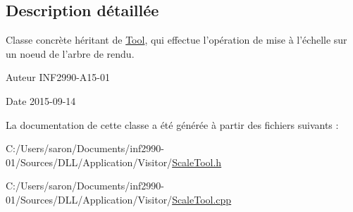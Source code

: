 \subsection{Description détaillée}
Classe concrète héritant de \hyperlink{class_tool}{Tool}, qui effectue l'opération de mise à l'échelle sur un noeud de l'arbre de rendu. 

\begin{DoxyAuthor}{Auteur}
I\-N\-F2990-\/\-A15-\/01 
\end{DoxyAuthor}
\begin{DoxyDate}{Date}
2015-\/09-\/14 
\end{DoxyDate}


La documentation de cette classe a été générée à partir des fichiers suivants \-:\begin{DoxyCompactItemize}
\item 
C\-:/\-Users/saron/\-Documents/inf2990-\/01/\-Sources/\-D\-L\-L/\-Application/\-Visitor/\hyperlink{_scale_tool_8h}{Scale\-Tool.\-h}\item 
C\-:/\-Users/saron/\-Documents/inf2990-\/01/\-Sources/\-D\-L\-L/\-Application/\-Visitor/\hyperlink{_scale_tool_8cpp}{Scale\-Tool.\-cpp}\end{DoxyCompactItemize}

